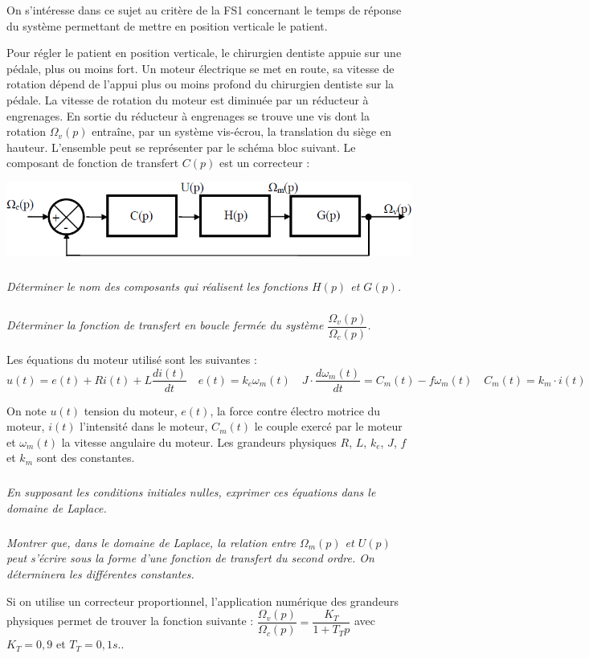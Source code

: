 \documentclass[11pt,oneside]{article}
\begin{document}
On s'intéresse dans ce sujet au critère de la FS1 concernant le temps de réponse du système permettant de mettre en position verticale le patient. 

Pour régler le patient en position verticale, le chirurgien dentiste appuie sur une pédale, plus ou moins fort. Un moteur électrique se met en route, sa vitesse de rotation dépend de l'appui plus ou moins profond du chirurgien dentiste sur la pédale. La vitesse de rotation du moteur est diminuée par un réducteur à engrenages. En sortie du réducteur à engrenages se trouve une vis dont la rotation $\Omega_v(p)$ entraîne, par un système vis-écrou, la translation du siège en hauteur. L'ensemble peut se représenter par le schéma bloc suivant. Le composant de fonction de transfert $C(p)$ est un correcteur :


\begin{center}
\includegraphics[width=.6\textwidth]{png/fig3}
\end{center}

\subparagraph{}
\textit{Déterminer le nom des composants qui réalisent les fonctions $H(p)$ et $G(p)$.}

\subparagraph{}
\textit{Déterminer la fonction de transfert en boucle fermée du système $\dfrac{\Omega_v(p)}{\Omega_c(p)}$.}

Les équations du moteur utilisé sont les suivantes :
$$
u(t)=e(t)+Ri(t)+L\dfrac{di(t)}{dt} \quad e(t) = k_e \omega_m(t) \quad J\cdot\dfrac{d\omega_m(t)}{dt} = C_m(t)-f\omega_m(t) \quad C_m(t)=k_m \cdot i(t)
$$

On note $u(t)$ tension du moteur, $e(t)$, la force contre électro motrice du moteur, $i(t)$ l'intensité dans le moteur, $C_m(t)$ le couple exercé par le moteur et $\omega_m(t)$ la vitesse angulaire du moteur. Les grandeurs physiques $R$, $L$, $k_e$, $J$, $f$ et $k_m$ sont des constantes.

\subparagraph{}
\textit{En supposant les conditions initiales nulles, exprimer ces équations dans le domaine de Laplace.}

\subparagraph{}
\textit{Montrer que, dans le domaine de Laplace, la relation entre $\Omega_m(p)$ et $U(p)$ peut s'écrire sous la forme d'une fonction de transfert du second ordre. On déterminera les différentes constantes.}

Si on utilise un correcteur proportionnel, l'application numérique des grandeurs physiques permet de trouver la fonction suivante : $\dfrac{\Omega_v(p)}{\Omega_c(p)} =\dfrac{K_T}{1+T_T p}$ avec $K_T=0,9$ et $T_T=0,1 s.$.
\end{document}
